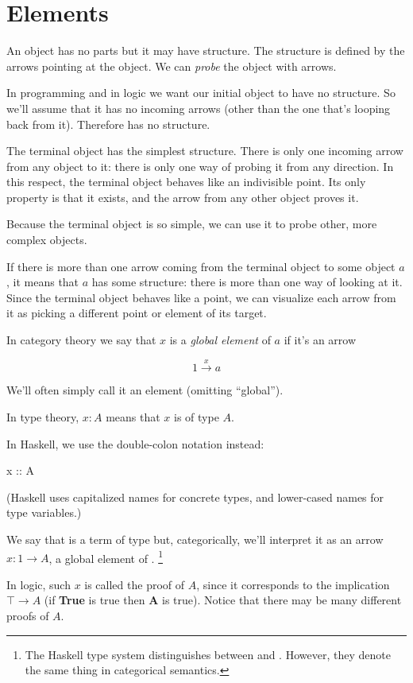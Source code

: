 \documentclass[DaoFP]{subfiles}
\begin{document}
\section{Elements}

An object has no parts but it may have structure. The structure is defined by the arrows pointing at the object. We can \emph{probe} the object with arrows.

In programming and in logic we want our initial object to have no structure. So we'll assume that it has no incoming arrows (other than the one that's looping back from it). Therefore  has no structure. 

The terminal object has the simplest structure. There is only one incoming arrow from any object to it: there is only one way of probing it from any direction. In this respect, the terminal object behaves like an indivisible point. Its only property is that it exists, and the arrow from any other object proves it. 

Because the terminal object is so simple, we can use it to probe other, more complex objects. 

If there is more than one arrow coming from the terminal object to some object $a$, it means that $a$ has some structure: there is more than one way of looking at it. Since the terminal object behaves like a point, we can visualize each arrow from it as picking a different point or element of its target. 

In category theory we say that $ x$ is a \emph{global element} of $a$ if it's an arrow

\[ 1 \xrightarrow x a \]

We'll often simply call it an element (omitting ``global'').

In type theory, $ x \colon A$ means that $x$ is of type $A$.

In Haskell, we use the double-colon notation instead:
\begin{haskell}
x :: A
\end{haskell}
(Haskell uses capitalized names for concrete types, and lower-cased names for type variables.)

We say that  is a term of type  but, categorically, we'll interpret it as an arrow $x : 1 \to A$, a global element of . \footnote{The Haskell type system distinguishes between  and . However, they denote the same thing in categorical semantics.}

In logic, such $ x$ is called the proof of $ A$, since it corresponds to the implication $ \top \to A$ (if \textbf{True} is true then \textbf{A} is true). Notice that there may be many different proofs of $A$.
\end{document}
